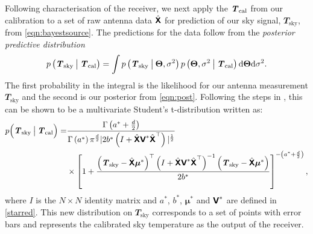 Following characterisation of the receiver, we next apply the $\y$ from our calibration to a set of raw antenna data $\hat{\mathbfss{X}}$ for prediction of our sky signal, $\mathbfit{T}_{\mathrm{sky}}$, from \cref{eqn:bayestsource}. The predictions for the data follow from the \emph{posterior predictive distribution}
\begin{equation}
    p\left(\mathbfit{T}_{\mathrm{sky}} \given[\big] \mathbfit{T}_{\mathrm{cal}} \right) = \int p\left( \mathbfit{T}_{\mathrm{sky}} \given[\big] \boldsymbol{\Theta},\sigma^2 \right) p \left( \boldsymbol{\Theta},\sigma^2 \given[\big] \mathbfit{T}_{\mathrm{cal}} \right) \mathrm{d}\boldsymbol{\Theta}\mathrm{d}\sigma^2.
\end{equation}
The first probability in the integral is the likelihood for our antenna measurement $\mathbfit{T}_{\mathrm{sky}}$ and the second is our posterior from \cref{eqn:post}. Following the steps in \citet{banerjee}, this can be shown to be a multivariate Student's t-distribution written as:
\begin{equation}\label{eqn:predictive}
    \begin{aligned}
    p\Big(\mathbfit{T}_{\mathrm{sky}} \given[\big] \mathbfit{T}_{\mathrm{cal}} \Big) = &\frac{\Gamma\left( a^* + \frac{d}{2} \right)}{\Gamma\left( a^* \right)\pi^{\frac{d}{2}}|2b^*\left( I + \hat{\mathbfss{X}}\mathbfss{V}^*\hat{\mathbfss{X}}^{\top}\right)|^{\frac{1}{2}}}
    \\ & \times
    \left[ 1 + \frac{\left( \mathbfit{T}_{\mathrm{sky}} - \hat{\mathbfss{X}}\boldsymbol{\mu}^* \right)^{\top} \left( I + \hat{\mathbfss{X}}\mathbfss{V}^*\hat{\mathbfss{X}}^{\top} \right)^{-1} \left( \mathbfit{T}_{\mathrm{sky}} - \hat{\mathbfss{X}}\boldsymbol{\mu}^* \right)}{2b^*} \right]^{-\left( a^* + \frac{d}{2} \right)},
    \end{aligned}
\end{equation}
where $I$ is the $N \times N$ identity matrix and $a^*$, $b^*$, $\boldsymbol{\mu}^*$ and $\mathbfss{V}^*$ are defined in \cref{starred}. This new distribution on $\mathbfit{T}_{\mathrm{sky}}$ corresponds to a set of points with error bars and represents the calibrated sky temperature as the output of the receiver.

